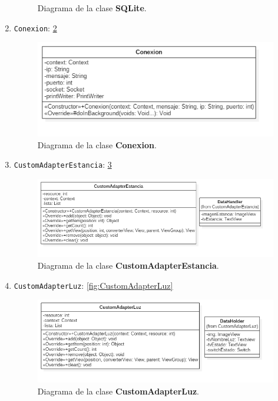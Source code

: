 \begin{enumerate}
\begin{figure}[h!]
		\caption{Diagrama de la clase \textbf{SQLite}.}
		\label{fig:SQLite}
	\end{figure}
	\item \verb|Conexion|: \ref{fig:Conexion}
	\begin{figure}[h!]
		\centering
		\includegraphics[width=1.1\linewidth]{img/Conexion}
		\caption{Diagrama de la clase \textbf{Conexion}.}
		\label{fig:Conexion}
	\end{figure}
	\item \verb|CustomAdapterEstancia|: \ref{fig:CustomAdapterEstancia}
	\begin{figure}[h!]
		\centering
		\includegraphics[width=1.2\linewidth]{img/CustomAdapterEstancia}
		\caption{Diagrama de la clase \textbf{CustomAdapterEstancia}.}
		\label{fig:CustomAdapterEstancia}
	\end{figure}
	\item \verb|CustomAdapterLuz|: \ref{fig:CustomAdapterLuz}
	\begin{figure}[h!]
		\centering
		\includegraphics[width=1.3\linewidth]{img/CustomAdapterLuz}
		\caption{Diagrama de la clase \textbf{CustomAdapterLuz}.}

\end{figure}
\end{enumerate}
